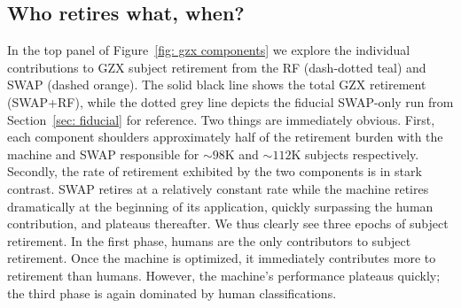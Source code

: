 \subsection{Who retires what, when?}  

In the top panel of Figure~\ref{fig: gzx components} we explore the individual 
contributions to GZX subject retirement from the RF (dash-dotted teal) 
and SWAP (dashed orange). The solid black line shows the total GZX retirement (SWAP+RF), while the dotted grey line depicts the fiducial SWAP-only run from 
Section~\ref{sec: fiducial} for reference. Two things are immediately obvious. First, each component shoulders approximately half of the retirement burden with the machine and SWAP responsible for $\sim$$98$K and $\sim$$112$K subjects respectively. Secondly, the rate of retirement exhibited by the two components is in stark contrast. SWAP retires at a relatively constant rate while the machine retires dramatically at the beginning of its application, quickly surpassing the human contribution, and plateaus thereafter. We thus clearly see three epochs of subject retirement. In the first phase, humans are the only contributors to subject retirement. Once the machine is optimized, it immediately contributes more to retirement than humans. However, the machine's performance plateaus quickly; the third phase is again dominated by human classifications.


